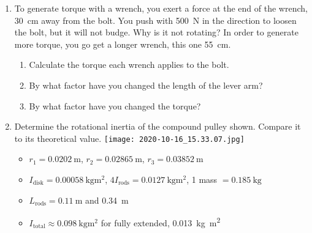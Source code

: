 \begin{enumerate}
    \item To generate torque with a wrench, you exert a force at the end of the wrench, \SI{30}{\centi\meter} away from the bolt. You push with \SI{500}{\newton} in the direction to loosen the bolt, but it will not budge. Why is it not rotating? In order to generate more torque, you go get a longer wrench, this one \SI{55}{\centi\meter}.

		\begin{enumerate}
			
			\item Calculate the torque each wrench applies to the bolt.
			
			\item By what factor have you changed the length of the lever arm?
			
			\item By what factor have you changed the torque?
		\end{enumerate}\bigskip
	
%	
%	
	\item Determine the rotational inertia of the compound pulley shown. Compare it to its theoretical value.
	\texttt{[image: 2020-10-16\_15.33.07.jpg]}
	\begin{itemize}
		\item $r_1 = \SI{0.0202}{\meter}$, $r_2 = \SI{0.02865}{\meter}$, $r_3 = \SI{0.03852}{\meter}$
		
		\item $I_{\text{disk}} = \SI{0.00058}{\kilogram\meter\squared}$, $4I_{\text{rods}} = \SI{0.0127}{\kilogram\meter\squared}$, 1 mass $= \SI{0.185}{\kilogram}$
		
		\item $L_{\text{rods}} = \SI{0.11}{\meter}$ and \SI{0.34}{\meter}
		
		\item $I_{\text{total}} \approx \SI{0.098}{\kilogram\meter\squared}$ for fully extended, \SI{0.013}{\kilogram\meter\squared}
	\end{itemize}
	

\end{enumerate}

